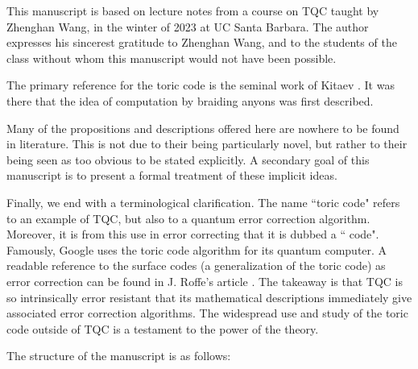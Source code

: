 \documentclass{article}
\theoremstyle{definition}
\numberwithin{figure}{section}
\begin{document}
This manuscript is based on lecture notes from a course on TQC taught by Zhenghan Wang, in the winter of 2023 at UC Santa Barbara. The author expresses his sincerest gratitude to Zhenghan Wang, and to the students of the class without whom this manuscript would not have been possible.

The primary reference for the toric code is the seminal work of Kitaev \cite{kitaev2003fault}. It was there that the idea of computation by braiding anyons was first described.

Many of the propositions and descriptions offered here are nowhere to be found in literature. This is not due to their being particularly novel, but rather to their being seen as too obvious to be stated explicitly. A secondary goal of this manuscript is to present a formal treatment of these implicit ideas.

Finally, we end with a terminological clarification. The name ``toric code" refers to an example of TQC, but also to a quantum error correction algorithm. Moreover, it is from this use in error correcting that it is dubbed a `` code". Famously, Google uses the toric code algorithm for its quantum computer. A readable reference to the surface codes (a generalization of the toric code) as error correction can be found in J. Roffe's article \cite{roffe2019quantum}. The takeaway is that TQC is so intrinsically error resistant that its mathematical descriptions immediately give associated error correction algorithms. The widespread use and study of the toric code outside of TQC is a testament to the power of the theory.


The structure of the manuscript is as follows:
\end{document}
